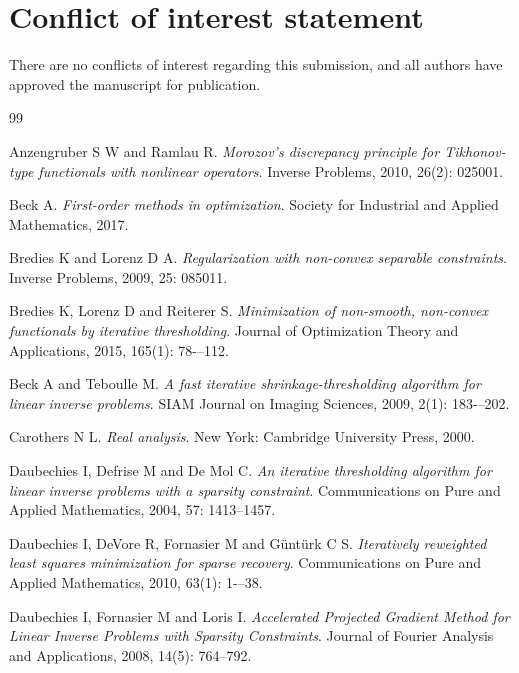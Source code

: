 \documentclass[a4paper,12pt]{article}
\numberwithin{equation}{section}
\begin{document}
\section{Conflict of interest statement}
There are no conflicts of interest regarding this submission, and all authors have approved the manuscript for publication.


\begin{thebibliography}{99}

Anzengruber S W and Ramlau R. \emph{Morozov’s discrepancy principle for Tikhonov-type
functionals with nonlinear operators}. Inverse Problems, 2010, 26(2): 025001.


Beck A. \emph{First-order methods in optimization}. Society for Industrial and Applied Mathematics, 2017.

Bredies K and Lorenz D A. \emph{Regularization with non-convex separable constraints}. Inverse Problems, 2009, 25: 085011.


Bredies K, Lorenz D and Reiterer S. \emph{Minimization of non-smooth, non-convex functionals by iterative thresholding}. Journal of Optimization Theory and Applications, 2015, 165(1): 78-–112.

Beck A and Teboulle M. \emph{A fast iterative shrinkage-thresholding algorithm for linear inverse problems}. SIAM Journal on Imaging Sciences, 2009, 2(1): 183-–202.

Carothers N L. \emph{Real analysis}. New York: Cambridge University Press, 2000.

Daubechies I, Defrise M and De Mol C. \emph{An iterative thresholding algorithm for linear inverse problems with a sparsity constraint}. Communications on Pure and Applied Mathematics, 2004, 57: 1413--1457.

Daubechies I, DeVore R, Fornasier M and Güntürk C S. \emph{Iteratively reweighted least squares minimization for sparse recovery}. Communications on Pure and Applied Mathematics, 2010, 63(1): 1-–38.

Daubechies I, Fornasier M and Loris I. \emph{Accelerated Projected Gradient Method for Linear Inverse Problems with Sparsity Constraints}. Journal of Fourier Analysis and Applications, 2008, 14(5): 764–792.


\end{thebibliography}
\end{document}
